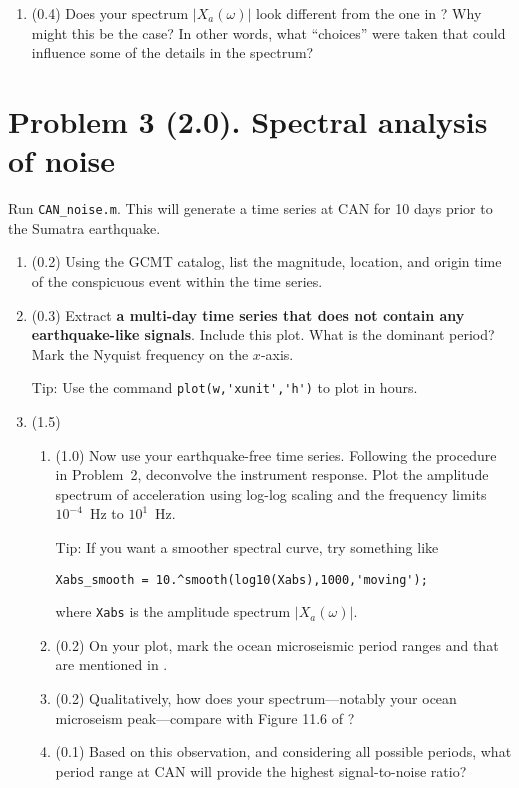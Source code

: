 \documentclass[11pt,titlepage,fleqn]{article}
\begin{document}
\begin{enumerate}

\item (0.4) Does your spectrum $|X_a(\omega)|$ look different from the one in \citet{Park2005}? Why might this be the case? In other words, what ``choices'' were taken that could influence some of the details in the spectrum?

\end{enumerate}


\section*{Problem 3 (2.0). Spectral analysis of noise}

Run \verb+CAN_noise.m+. This will generate a time series at CAN for 10 days prior to the Sumatra earthquake.

\begin{enumerate}
\item (0.2) Using the GCMT catalog, list the magnitude, location, and origin time of the conspicuous event within the time series. 

\item (0.3) Extract {\bf a multi-day time series that does not contain any earthquake-like signals}. Include this plot. What is the dominant period? Mark the Nyquist frequency on the $x$-axis.

Tip: Use the command \verb+plot(w,'xunit','h')+ to plot in hours.

\item (1.5)

\begin{enumerate}
\item (1.0) Now use your earthquake-free time series.
Following the procedure in Problem~2, deconvolve the instrument response.
Plot the amplitude spectrum of acceleration using log-log scaling and the frequency limits $10^{-4}$~Hz to $10^1$~Hz.

Tip: If you want a smoother spectral curve, try something like

\noindent
\verb+Xabs_smooth = 10.^smooth(log10(Xabs),1000,'moving');+

\noindent
where \verb+Xabs+ is the amplitude spectrum $|X_a(\omega)|$.

\item (0.2) On your plot, mark the ocean microseismic period ranges  and  that are mentioned in \citet[][Section 11.2]{ShearerE2}.

\item (0.2) Qualitatively, how does your spectrum---notably your ocean microseism peak---compare with Figure 11.6 of \citet{ShearerE2}?

\item (0.1) Based on this observation, and considering all possible periods, what period range at CAN will provide the highest signal-to-noise ratio?

\end{enumerate}

\end{enumerate}
\end{document}
